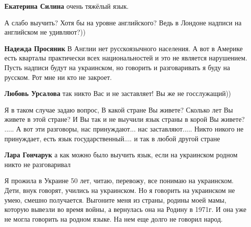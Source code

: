 \begin{itemize}
\begin{itemize}
\textbf{Екатерина Силина} очень тяжёлый язык.
\end{itemize}


А слабо выучить? Хотя бы на уровне английского? Ведь в Лондоне надписи на английском не удивляют?))

\begin{itemize}

\textbf{Надежда Просяник} В Англии нет русскоязычного населения. А вот в
Америке есть кварталы практически всех национальностей и это не является
нарушением. Пусть надписи будут на украинском, но говорить и разговаривать я
буду на русском. Рот мне ни кто не закроет.


\textbf{Любовь Урсалова} так никто Вас и не заставляет! Вы же не госслужащий))
\end{itemize}


Я в таком случае задаю вопрос, В какой стране Вы живете? Сколько лет Вы живете
в этой стране? И Вы так и не выучили язык страны в корой Вы живете? ..... А вот
эти разговоры, нас принуждают... нас заставляют..... Никто никого не
принуждает, есть язык государственный.... и так в любой другой стране

\begin{itemize}

\textbf{Лара Гончарук} а как можно было выучить язык, если на украинском родном никто не разговаривал


Я прожила в Украине 50 лет, читаю, перевожу, все понимаю на украинском. Дети,
внук говорят, учились на украинском. Но я говорить на украинском не умею, смешно
получается. Выгоните меня из страны, родины моей мамы, которую вывезли во время
войны, а вернулась она на Родину в 1971г. И она уже не могла говорить на родном
языке. На нем еще долго не говорил народ.


\end{itemize}
\end{itemize}
